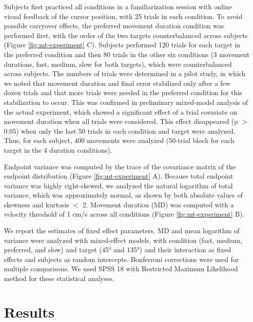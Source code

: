 Subjects first practiced all conditions in a familiarization session with online visual feedback of the cursor position, with 25 trials in each condition. 
To avoid possible carryover effects, the preferred movement duration condition was performed first, with the order of the two targets counterbalanced across subjects (Figure \ref{fig:mt-experiment} C). 
Subjects performed 120 trials for each target in the preferred condition and then 80 trials in the other six conditions (3 movement durations, fast, medium, slow for both targets), which were counterbalanced across subjects. 
The numbers of trials were determined in a pilot study, in which we noted that movement duration and final error stabilized only after a few dozen trials and that more trials were needed in the preferred condition for this stabilization to occur. 
This was confirmed in preliminary mixed-model analysis of the actual experiment, which showed a significant effect of a trial covariate on movement duration when all trials were considered. This effect disappeared (p $>$ 0.05) when only the last 50 trials in each condition and target were analyzed. Thus, for each subject, 400 movements were analyzed (50-trial block for each target in the 4 duration conditions).

Endpoint variance was computed by the trace of the covariance matrix of the endpoint distribution (Figure \ref{fig:mt-experiment} A). Because total endpoint variance was highly right-skewed, we analyzed the natural logarithm of total variance, which was approximately normal, as shown by both absolute values of skewness and kurtosis $<$ 2. Movement duration (MD) was computed with a velocity threshold of 1 cm/s across all conditions (Figure \ref{fig:mt-experiment} B).

We report the estimates of fixed effect parameters. MD and mean logarithm of variance were analyzed with mixed-effect models, with condition (fast, medium, preferred, and slow) and target (\ang{45} and \ang{135}) and their interaction as fixed effects and subjects as random intercepts. Bonferroni corrections were used for multiple comparisons. We used SPSS 18 with Restricted Maximum Likelihood method for these statistical analyses.

\section{Results}

